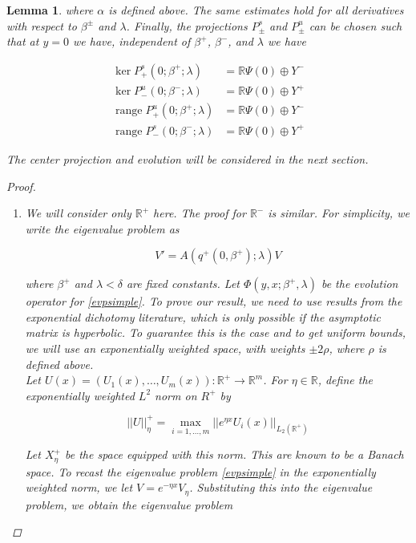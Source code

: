 \documentclass[12pt]{article}
\def\R{{\mathbb R}}
\DeclareMathOperator{\ran}{range}
\newtheorem{lemma}{Lemma}
\begin{document}
\begin{lemma}
where $\alpha$ is defined above. The same estimates hold for all derivatives with respect to $\beta^\pm$ and $\lambda$. Finally, the projections $P^s_\pm$ and $P^u_\pm$ can be chosen such that at $y = 0$ we have, independent of $\beta^+$, $\beta^-$, and $\lambda$ we have

\begin{align*}
\ker P^s_+(0; \beta^+; \lambda) &= \R \Psi(0) \oplus Y^- \\
\ker P^u_-(0; \beta^-; \lambda) &= \R \Psi(0) \oplus Y^+ \\
\ran P^u_+(0; \beta^+; \lambda) &= \R \Psi(0) \oplus Y^- \\
\ran P^s_-(0; \beta^-; \lambda) &= \R \Psi(0) \oplus Y^+
\end{align*}

The center projection and evolution will be considered in the next section.

\begin{proof}
\begin{enumerate}

\item We will consider only $\R^+$ here. The proof for $\R^-$ is similar. For simplicity, we write the eigenvalue problem as 

\begin{equation}\label{evpsimple}
V' = A(q^+(0, \beta^+); \lambda) V
\end{equation}

where $\beta^+$ and $\lambda < \delta$ are fixed constants. Let $\Phi(y, x; \beta^+, \lambda)$ be the evolution operator for \eqref{evpsimple}. To prove our result, we need to use results from the exponential dichotomy literature, which is only possible if the asymptotic matrix is hyperbolic. To guarantee this is the case and to get uniform bounds, we will use an exponentially weighted space, with weights $\pm 2 \rho$, where $\rho$ is defined above.\\

Let $U(x) = (U_1(x), \dots, U_m(x)): \R^+ \rightarrow \R^m$. For $\eta \in \R$, define the exponentially weighted $L^2$ norm on $R^+$ by

\[
||U||_\eta^+ = \max_{i = 1, \dots, m} ||e^{\eta x}U_i(x)||_{L_2(\R^+)}
\]

Let $X^+_\eta$ be the space equipped with this norm. This are known to be a Banach space. To recast the eigenvalue problem \eqref{evpsimple} in the exponentially weighted norm, we let $V = e^{-\eta x} V_\eta$. Substituting this into the eigenvalue problem, we obtain the eigenvalue problem


\end{enumerate}
\end{proof}
\end{lemma}
\end{document}
